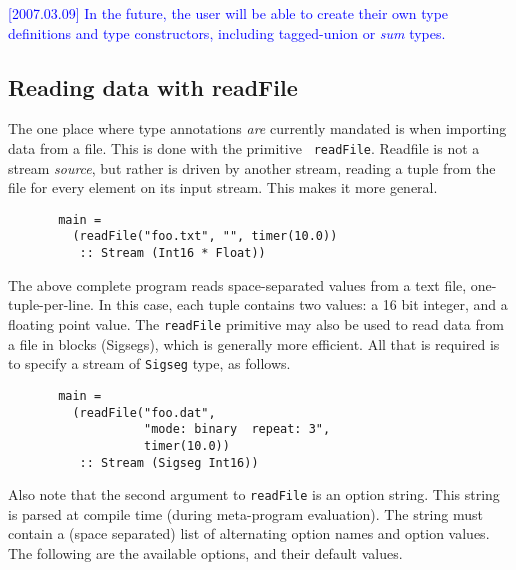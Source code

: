 \documentclass[twocolumn]{report}
\newcommand{\rednote}[1]{{\textcolor{blue}{#1}}}
\begin{document}
\rednote{[2007.03.09] In the future, the user will be able to create
  their own type definitions and type constructors, including
  tagged-union or {\em sum} types.}


\subsection{Reading data with readFile}

The one place where type annotations {\em are} currently mandated is
when importing data from a file.  This is done with the primitive {\tt
readFile}.  Readfile is not a stream {\em source}, but rather is driven by
another stream, reading a tuple from the file for every element on its
input stream.  This makes it more general.
%
\begin{verbatim}
       main = 
         (readFile("foo.txt", "", timer(10.0))
          :: Stream (Int16 * Float))
\end{verbatim}

The above complete program reads space-separated values from a text
file, one-tuple-per-line.  In this case, each tuple contains two
values: a 16 bit integer, and a floating point value.
The {\tt readFile} primitive may also be
used to read data from a file in blocks (Sigsegs), which is generally
more efficient.  All that is required is to specify a stream of
{\tt Sigseg} type, as follows.

\begin{verbatim}
       main =
         (readFile("foo.dat", 
                   "mode: binary  repeat: 3", 
                   timer(10.0))
          :: Stream (Sigseg Int16))
\end{verbatim}

Also note that the second argument to {\tt readFile} is an option
string.  This string is parsed at compile time (during meta-program
evaluation).  The string must contain a (space separated) list of
alternating option names and option values.  The following are the
available options, and their default values.
\end{document}
